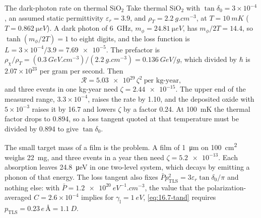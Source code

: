 \begin{workedexample}{The dark-photon rate on thermal SiO$_2$}\label{we:16-tls-dp}
Take thermal SiO$_2$ with $\tan\delta_0 = 3\times10^{-4}$, an assumed static permittivity $\varepsilon_r = 3.9$, and $\rho_T = \SI{2.2}{g.cm^{-3}}$, at $T = \SI{10}{mK}$ ($T = \SI{0.862}{\micro eV}$). A dark photon of \SI{6}{GHz}, $m_\phi = \SI{24.81}{\micro eV}$, has $m_\phi/2T = 14.4$, so $\tanh(m_\phi/2T) = 1$ to eight digits, and the loss function is $L = 3\times10^{-4}/3.9 = \num{7.69e-5}$. The prefactor is $\rho_\chi/\rho_T = (\SI{0.3}{GeV.cm^{-3}})/(\SI{2.2}{g.cm^{-3}}) = \SI{0.136}{GeV/g}$, which divided by $\hbar$ is $2.07\times10^{23}$ per gram per second. Then
\begin{equation*}
  \mathcal{R} = \num{5.03e29}\,\zeta^2\ \text{per kg-year} ,
\end{equation*}
and three events in one kg-year need $\zeta = \num{2.44e-15}$. The upper end of the measured range, $3.3\times10^{-4}$, raises the rate by 1.10, and the deposited oxide with $5\times10^{-3}$ raises it by 16.7 and lowers $\zeta$ by a factor 0.24. At \SI{100}{mK} the thermal factor drops to 0.894, so a loss tangent quoted at that temperature must be divided by 0.894 to give $\tan\delta_0$.

The small target mass of a film is the problem. A film of \SI{1}{\micro m} on \SI{100}{cm^2} weighs \SI{22}{mg}, and three events in a year then need $\zeta = \num{5.2e-13}$. Each absorption leaves \SI{24.8}{\micro eV} in one two-level system, which decays by emitting a phonon of that energy. The loss tangent also fixes $\bar Pp_{\mathrm{TLS}}^2 = 3\varepsilon_r\tan\delta_0/\pi$ and nothing else: with $\bar P = \SI{1.2e20}{eV^{-1}.cm^{-3}}$, the value that the polarization-averaged $C = 2.6\times10^{-4}$ implies for $\gamma_{\mathrm{l}} = \SI{1}{eV}$, \cref{eq:16.7-tand} requires $p_{\mathrm{TLS}} = 0.23\,e\,\text{\AA} = \SI{1.1}{D}$.
\end{workedexample}

